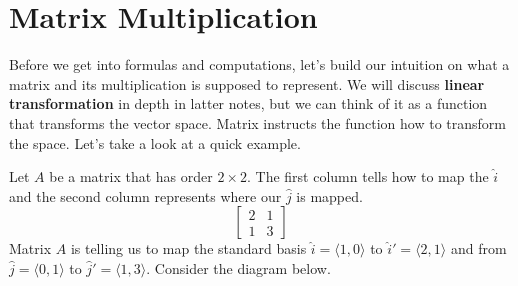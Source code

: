 \documentclass[../main.tex]{subfiles}
\begin{document}
\section{Matrix Multiplication}

Before we get into formulas and computations, let's build our
intuition on what a matrix and its multiplication is supposed to
represent. We will discuss \textbf{linear transformation} in
depth in latter notes, but we can think of it as a function that
transforms the vector space. Matrix instructs the function how to
transform the space. Let's take a look at a quick example.

Let $A$ be a matrix that has order $2 \times 2$. The first column
tells how to map the $\hat{i}$ and the second column represents
where our $\hat{j}$ is mapped.
\[
\begin{bmatrix}
    2 & 1 \\
    1 & 3
\end{bmatrix}
\]
Matrix $A$ is telling us to map the standard basis $\hat{i} =
\langle 1, 0 \rangle$ to $\hat{i}'= \langle 2, 1 \rangle$ and from
$\hat{j} = \langle 0, 1 \rangle$ to $\hat{j}' = \langle 1, 3 \rangle$.
Consider the diagram below.
\end{document}
